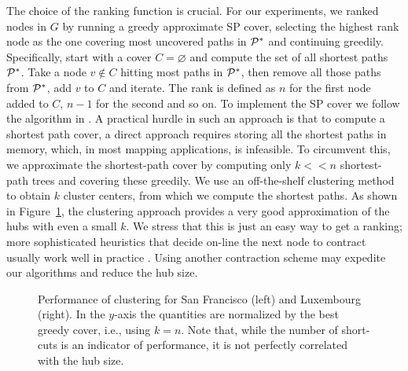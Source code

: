 \documentclass[opre,nonblindrev]{informs3} %
\begin{document}
The choice of the ranking function is crucial.
For our experiments, we ranked nodes in $G$ by running a greedy approximate SP cover, selecting the highest rank node as the one covering most uncovered paths in $\mathcal{P}^*$ and continuing greedily. 
Specifically, start with a cover $C=\varnothing$ and compute the set of all shortest paths $\mathcal{P}^*$.
Take a node $v\notin C$ hitting most paths in $\mathcal{P}^*$, then remove all those paths from $\mathcal{P}^*$, add $v$ to $C$ and iterate.
The rank is defined as $n$ for the first node added to $C$, $n-1$ for the second and so on.
To implement the SP cover we follow the algorithm in \cite{hubimplem}.
A practical hurdle in such an approach is that to compute a shortest path cover, a direct approach requires storing all the shortest paths in memory, which, in most mapping applications, is infeasible.
To circumvent this, we approximate the shortest-path cover by computing only $k<<n$ shortest-path trees and covering these greedily.
We use an off-the-shelf clustering method to obtain $k$ cluster centers, from which we compute the shortest paths. 
As shown in Figure~\ref{fig:clusters}, the clustering approach provides a very good approximation of the hubs with even a small $k$.
We stress that this is just an easy way to get a ranking; more sophisticated heuristics that decide on-line the next node to contract usually work well in practice \cite{goldberg_survey,rice_csp}.
Using another contraction scheme may expedite our algorithms and reduce the hub size.


\begin{figure}
\caption{Performance of clustering for San Francisco (left) and Luxembourg (right). 
In the $y$-axis the quantities are normalized by the best greedy cover, i.e., using $k=n$.
Note that, while the number of short-cuts is an indicator of performance, it is not perfectly correlated with the hub size.}
\label{fig:clusters}
\end{figure}
\end{document}

